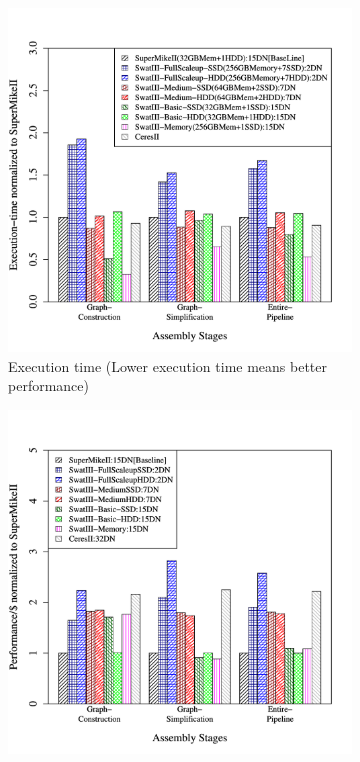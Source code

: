 \documentclass[conference]{IEEEtran}
\begin{document}
\begin{figure}[htb]
        \begin{subfigure}[b]{0.5\textwidth}
                \includegraphics[width=\textwidth, height=.27\textheight]{Figure/PerormanceData/Plots/PerfDiffArch.pdf}
                \caption{Execution time (Lower execution time means better performance)}
                \label{fig:DifferentArchitecturesPerf}
        \end{subfigure}
        \begin{subfigure}[b]{0.5\textwidth}
                \includegraphics[width=\textwidth, height=.27\textheight]{Figure/PerormanceData/Plots/PerfPerDollarDiffArch.pdf}

\end{subfigure}
\end{figure}
\end{document}
